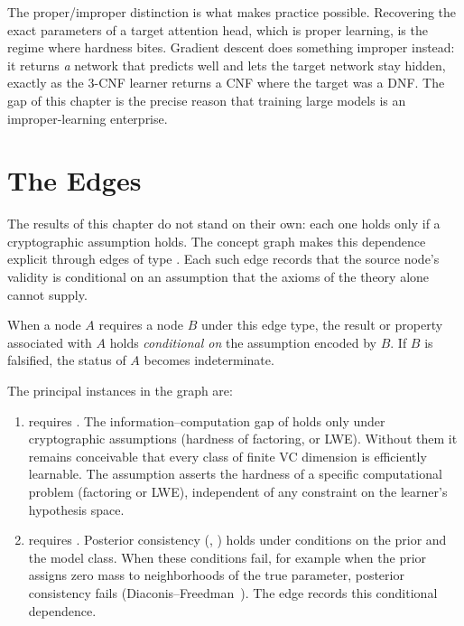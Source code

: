 The proper/improper distinction is what makes practice possible. Recovering
the exact parameters of a target attention head, which is proper learning, is the
regime where hardness bites. Gradient descent does something improper
instead: it returns \emph{a} network that predicts well and lets the target
network stay hidden, exactly as the $3$-CNF learner returns a CNF where the
target was a DNF. The gap of this chapter is the precise reason that training
large models is an improper-learning enterprise.



\section{The  Edges}
\label{sec:requires-assumption}

The results of this chapter do not stand on their own: each one holds only if a
cryptographic assumption holds.  The concept graph makes this dependence
explicit through edges of type .  Each such edge
records that the source node's validity is conditional on an assumption that
the axioms of the theory alone cannot supply.

\begin{defn}
\label{def:requires-assumption}
When a node $A$ requires a node $B$ under this edge type, the result or property
associated with $A$ holds \emph{conditional on} the assumption encoded
by $B$.  If $B$ is falsified, the status of $A$ becomes indeterminate.
\end{defn}

The principal instances in the graph are:

\begin{enumerate}[leftmargin=*,itemsep=3pt]
\item {} requires .
  The information--computation gap of  holds only
  under cryptographic assumptions (hardness of factoring, or LWE).  Without
  them it remains conceivable that every class of finite VC dimension is
  efficiently learnable.  The assumption asserts the hardness of a specific
  computational problem (factoring or LWE), independent of any constraint on
  the learner's hypothesis space.

\item {} requires .
  Posterior consistency (, ) holds under
  conditions on the prior and the model class.  When these conditions
  fail, for example when the prior assigns zero mass to neighborhoods of
  the true parameter, posterior consistency fails
  (Diaconis--Freedman~\cite{DiaconisFreedman1986}).  The edge records this
  conditional dependence.
\end{enumerate}

